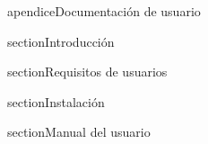 apendice{Documentación de usuario}

section{Introducción}

section{Requisitos de usuarios}

section{Instalación}

section{Manual del usuario}